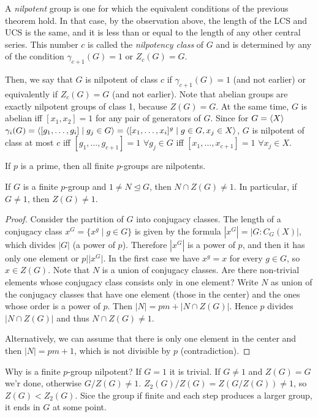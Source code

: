 \documentclass[twoside, 11pt]{article}
\begin{document}
\begin{defi}
A \emph{nilpotent} group is one for which the equivalent conditions of the previous theorem hold. In that case, by the observation above, the length of the LCS and UCS is the same, and it is less than or equal to the length of any other central series. This number $c$ is called the \emph{nilpotency class} of $G$ and is determined by any of the condition $\gamma_{c+1}(G)=1$ or $Z_c(G)=G$. 
\end{defi}


Then, we say that $G$ is nilpotent of class $c$ if $\gamma_{c+1}(G)=1$ (and not earlier) or equivalently if $Z_c(G)=G$ (and not earlier). Note that abelian groups are exactly nilpotent groups of class 1, because $Z(G)=G$. At the same time, $G$ is abelian iff $[x_1,x_2]=1$ for any pair of generators of $G$. Since for $G=\langle{X}\rangle$ $\gamma_i(G)=\langle{[g_1,\dots, g_i]\mid g_j\in G}\rangle=\langle{[x_1,\dots, x_i]^g\mid g\in G, x_j\in X}\rangle$, $G$ is nilpotent of class at most $c$ iff $[g_1,\dots, g_{c+1}]=1$ $\forall g_j\in G$ iff $[x_1,\dots, x_{c+1}]=1$ $\forall x_j\in X$.

\begin{ej}
If $p$ is a prime, then all finite $p$-groups are nilpotents.

\begin{lemma}
If $G$ is a finite $p$-group and $1\neq N\trianglelefteq G$, then $N\cap Z(G)\neq 1$. In particular, if $G\neq 1$, then $Z(G)\neq 1$. 
\end{lemma}
\begin{proof}
Consider the partition of $G$ into conjugacy classes. The length of a conjugacy class $x^G=\{x^g\mid g\in G\}$ is given by the formula $|x^G|=|G:C_G(X)|$, which divides $|G|$ (a power of $p$). Therefore $|x^G|$ is a power of $p$, and then it has only one element or $p | |x^G|$. In the first case we have $x^g=x$ for every $g\in G$, so $x\in Z(G)$. Note that $N$ is a union of conjugacy classes. Are there non-trivial elements whose conjugacy class consists only in one element? Write $N$ as union of the conjugacy classes that have one element (those in the center) and the ones whose order is a power of $p$. Then $|N|=pm+|N\cap Z(G)|$. Hence $p$ divides $|N\cap Z(G)|$ and thus $N\cap Z(G)\neq 1$. 

Alternatively, we can assume that there is only one element in the center and then $|N|=pm+1$, which is not divisible by $p$ (contradiction).
\end{proof}

Why is a finite $p$-group nilpotent? If $G=1$ it is trivial. If $G\neq 1$ and $Z(G)=G$ we'r done, otherwise $G/Z(G)\neq 1$. $Z_2(G)/Z(G)=Z(G/Z(G))\neq 1$, so $Z(G)<Z_2(G)$. Sice the group if finite and each step produces a larger group, it ends in $G$ at some point.
\end{ej} 
\end{document}
